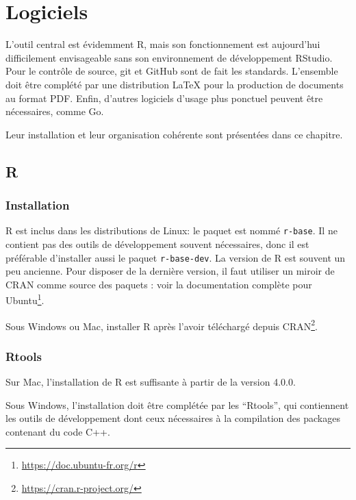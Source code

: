 \documentclass[
  12pt,
  french,
  a4paper,
  extrafontsizes,onecolumn,openright
  ]{memoir}
\begin{document}
\hypertarget{chap:logiciels}{%
\chapter{Logiciels}\label{chap:logiciels}}

L'outil central est évidemment R, mais son fonctionnement est aujourd'hui difficilement envisageable sans son environnement de développement RStudio.
Pour le contrôle de source, git et GitHub sont de fait les standards.
L'ensemble doit être complété par une distribution LaTeX pour la production de documents au format PDF.
Enfin, d'autres logiciels d'usage plus ponctuel peuvent être nécessaires, comme Go.

Leur installation et leur organisation cohérente sont présentées dans ce chapitre.

\hypertarget{r}{%
\section{R}\label{r}}

\hypertarget{installation}{%
\subsection{Installation}\label{installation}}

R est inclus dans les distributions de Linux: le paquet est nommé \texttt{r-base}.
Il ne contient pas des outils de développement souvent nécessaires, donc il est préférable d'installer aussi le paquet \texttt{r-base-dev}.
La version de R est souvent un peu ancienne.
Pour disposer de la dernière version, il faut utiliser un miroir de CRAN comme source des paquets : voir la documentation complète pour Ubuntu\footnote{\url{https://doc.ubuntu-fr.org/r}}.

Sous Windows ou Mac, installer R après l'avoir téléchargé depuis CRAN\footnote{\url{https://cran.r-project.org/}}.

\hypertarget{rtools}{%
\subsection{Rtools}\label{rtools}}

Sur Mac, l'installation de R est suffisante à partir de la version 4.0.0.

Sous Windows, l'installation doit être complétée par les \enquote{Rtools}, qui contiennent les outils de développement dont ceux nécessaires à la compilation des packages contenant du code C++.
\end{document}
